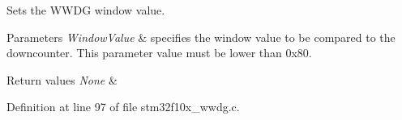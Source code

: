 Sets the W\+W\+DG window value. 


\begin{DoxyParams}{Parameters}
{\em Window\+Value} & specifies the window value to be compared to the downcounter. This parameter value must be lower than 0x80. \\
\hline
\end{DoxyParams}

\begin{DoxyRetVals}{Return values}
{\em None} & \\
\hline
\end{DoxyRetVals}


Definition at line 97 of file stm32f10x\+\_\+wwdg.\+c.

